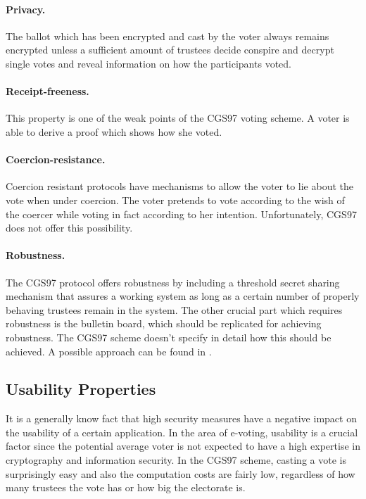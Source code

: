 \documentclass[numbers=noenddot, abstract=on, a4paper, headsepline,
footsepline, oneside, draft=off]{scrreprt}
\begin{document}
\paragraph{Privacy.} The ballot which has been encrypted and cast by the
voter always remains encrypted unless a sufficient amount of trustees decide
conspire and decrypt single votes and reveal information on how the participants
voted.

\paragraph{Receipt-freeness.} This property is one of the weak points of the
CGS97 voting scheme. A voter is able to derive a proof which shows how she
voted.

\paragraph{Coercion-resistance.} Coercion resistant protocols have mechanisms
to allow the voter to lie about the vote when under coercion. The voter pretends
to vote according to the wish of the coercer while voting in fact according to
her intention. Unfortunately, CGS97 does not offer this possibility.

\paragraph{Robustness.} The CGS97 protocol offers robustness by including a
threshold secret sharing mechanism that assures a working system as long as a
certain number of properly behaving trustees remain in the system. The other
crucial part which requires robustness is the bulletin board, which should be
replicated for achieving robustness. The CGS97 scheme doesn't specify in detail
how this should be achieved. A possible approach can be found in \cite{HL09}.

\subsection{Usability Properties}
\label{sec:usabilityproperties}
It is a generally know fact that high security measures have a negative impact
on the usability of a certain application. In the area of e-voting, usability is a
crucial factor since the potential average voter is not expected to have a high
expertise in cryptography and information security. In the CGS97 scheme, casting
a vote is surprisingly easy and also the computation costs are fairly low,
regardless of how many trustees the vote has or how big the electorate is.
\end{document}
